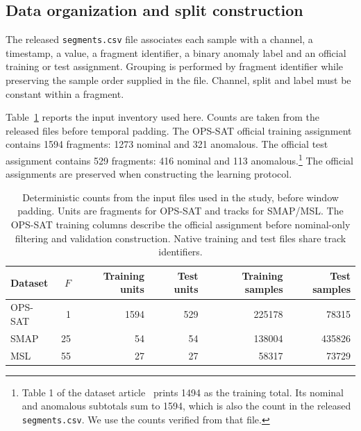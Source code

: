 \subsection{Data organization and split construction}
\label{sec:datasets-opssat-splits}
The released \texttt{segments.csv} file associates each sample with a channel,
a timestamp, a value, a fragment identifier, a binary anomaly label and an
official training or test assignment. Grouping is performed by fragment
identifier while preserving the sample order supplied in the file. Channel,
split and label must be constant within a fragment.

Table~\ref{tab:datasets-inventory} reports the input inventory used here.
Counts are taken from the released files before temporal padding. The
\ac{OPS-SAT} official training assignment contains \num{1594} fragments:
\num{1273} nominal and \num{321} anomalous. The official test assignment
contains \num{529} fragments: \num{416} nominal and \num{113}
anomalous.\footnote{Table 1 of the dataset article~\cite{Ruszczak2025OPSSAT} prints \num{1494} as the
training total. Its nominal and anomalous subtotals sum to \num{1594}, which
is also the count in the released \texttt{segments.csv}. We use the counts
verified from that file.} The official assignments are preserved when
constructing the learning protocol.

\begin{table}[htbp]
  \centering
  \small
  \begin{tabular}{@{}lrrrrr@{}}
    \toprule
    Dataset & \(F\) & Training units & Test units & Training samples & Test samples \\
    \midrule
    \acs{OPS-SAT} & 1 & \num{1594} & \num{529} & \num{225178} & \num{78315} \\
    \acs{SMAP} & 25 & \num{54} & \num{54} & \num{138004} & \num{435826} \\
    \acs{MSL} & 55 & \num{27} & \num{27} & \num{58317} & \num{73729} \\
    \bottomrule
  \end{tabular}
  \caption{Deterministic counts from the input files used in the study, before
  window padding. Units are fragments for \acs{OPS-SAT} and tracks for
  \acs{SMAP}/\acs{MSL}. The \acs{OPS-SAT} training columns describe the official
  assignment before nominal-only filtering and validation construction.
  Native training and test files share track identifiers.}
  \label{tab:datasets-inventory}
\end{table}

